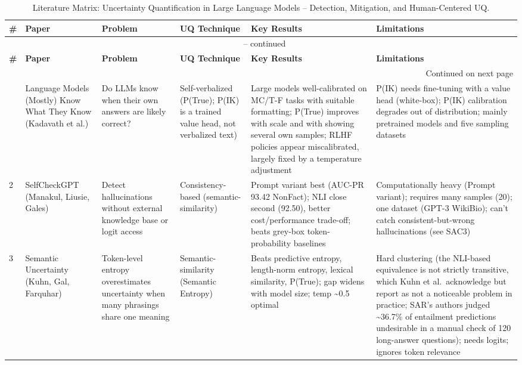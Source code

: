\documentclass[acmsmall]{acmart}
\begin{document}
\small
\begin{longtable}{p{0.3cm} >{\raggedright\arraybackslash}p{1.6cm} >{\raggedright\arraybackslash}p{1.4cm} >{\raggedright\arraybackslash}p{1.8cm} >{\raggedright\arraybackslash}p{2.6cm} >{\raggedright\arraybackslash}p{2.1cm}}
\caption{Literature Matrix: Uncertainty Quantification in Large Language Models -- Detection, Mitigation, and Human-Centered UQ.} \label{tab:uq-matrix-full} \\
\toprule
\textbf{\#} & \textbf{Paper} & \textbf{Problem} & \textbf{UQ Technique} & \textbf{Key Results} & \textbf{Limitations} \\
\midrule
\endfirsthead
\multicolumn{6}{c}{{\tablename\ \thetable{} -- continued}} \\
\toprule
\textbf{\#} & \textbf{Paper} & \textbf{Problem} & \textbf{UQ Technique} & \textbf{Key Results} & \textbf{Limitations} \\
\midrule
\endhead
\midrule \multicolumn{6}{r}{{Continued on next page}} \\
\endfoot
\bottomrule
\endlastfoot
1 & Language Models (Mostly) Know What They Know (Kadavath et al.) & Do LLMs know when their own answers are likely correct? & Self-verbalized (P(True); P(IK) is a trained value head, not verbalized text) & Large models well-calibrated on MC/\allowbreak T-F tasks with suitable formatting; P(True) improves with scale and with showing several own samples; RLHF policies appear miscalibrated, largely fixed by a temperature adjustment & P(IK) needs fine-tuning with a value head (white-box); P(IK) calibration degrades out of distribution; mainly pretrained models and five sampling datasets   \\
\midrule
2 & Self\-Check\-GPT (Manakul, Liusie, Gales) & Detect hallucinations without external knowledge base or logit access & Consis\-tency-based (semantic-similarity) & Prompt variant best (AUC-PR 93.42 NonFact); NLI close second (92.50), better cost/\allowbreak performance trade-off; beats grey-box token-probability baselines & Computationally heavy (Prompt variant); requires many samples (20); one dataset (GPT-3 WikiBio); can't catch consistent-but-wrong hallucinations (see SAC3)   \\
\midrule
3 & Semantic Uncertainty (Kuhn, Gal, Farquhar) & Token-level entropy overestimates uncertainty when many phrasings share one meaning & Semantic-similarity (Semantic Entropy) & Beats predictive entropy, length-norm entropy, lexical similarity, P(True); gap widens with model size; temp \textasciitilde{}0.5 optimal & Hard clustering (the NLI-based equivalence is not strictly transitive, which Kuhn et al.\ acknowledge but report as not a noticeable problem in practice; SAR's authors judged \textasciitilde{}36.7\% of entailment predictions undesirable in a manual check of 120 long-answer questions); needs logits; ignores token relevance   \\

\end{longtable}
\end{document}
